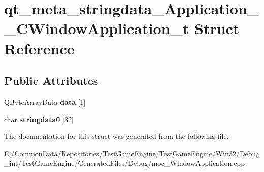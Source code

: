 \hypertarget{structqt__meta__stringdata___application_____c_window_application__t}{}\section{qt\+\_\+meta\+\_\+stringdata\+\_\+\+Application\+\_\+\+\_\+\+C\+Window\+Application\+\_\+t Struct Reference}
\label{structqt__meta__stringdata___application_____c_window_application__t}
\subsection*{Public Attributes}
\begin{DoxyCompactItemize}
\item 
\mbox{\label{structqt__meta__stringdata___application_____c_window_application__t_a305f1a28e98a74196f9061bfb8b62c8f}} 
Q\+Byte\+Array\+Data {\bfseries data} \mbox{[}1\mbox{]}
\item 
\mbox{\label{structqt__meta__stringdata___application_____c_window_application__t_a60d2e928c3abfb32e3f1335e4667b35c}} 
char {\bfseries stringdata0} \mbox{[}32\mbox{]}
\end{DoxyCompactItemize}


The documentation for this struct was generated from the following file\+:\begin{DoxyCompactItemize}
\item 
E\+:/\+Common\+Data/\+Repositories/\+Test\+Game\+Engine/\+Test\+Game\+Engine/\+Win32/\+Debug\+\_\+int/\+Test\+Game\+Engine/\+Generated\+Files/\+Debug/moc\+\_\+\+Window\+Application.\+cpp\end{DoxyCompactItemize}
